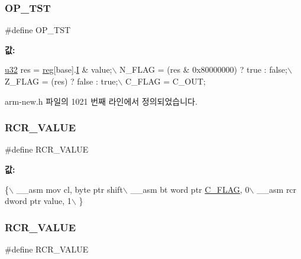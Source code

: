 \subsubsection{\texorpdfstring{O\+P\+\_\+\+T\+ST}{OP\_TST}\hspace{0.1cm}{\footnotesize\ttfamily [2/2]}}
{\footnotesize\ttfamily \#define O\+P\+\_\+\+T\+ST}

{\bfseries 값\+:}
\begin{DoxyCode}
\mbox{\hyperlink{_system_8h_a10e94b422ef0c20dcdec20d31a1f5049}{u32}} res = \mbox{\hyperlink{_g_b_a_8h_ae29faba89509024ffd1a292badcedf2d}{reg}}[base].\mbox{\hyperlink{unionreg__pair_a9f6a42d56c07829d7013571eda998252}{I}} & value;\(\backslash\)
      N\_FLAG = (res & 0x80000000) ? \textcolor{keyword}{true} : \textcolor{keyword}{false};\(\backslash\)
      Z\_FLAG = (res) ? \textcolor{keyword}{false} : \textcolor{keyword}{true};\(\backslash\)
      C\_FLAG = C\_OUT;
\end{DoxyCode}


arm-\/new.\+h 파일의 1021 번째 라인에서 정의되었습니다.

\mbox{\label{_g_b_a_8cpp_a3e5cbbfc0d14d2647260250013c74d8a}} 
\subsubsection{\texorpdfstring{R\+C\+R\+\_\+\+V\+A\+L\+UE}{RCR\_VALUE}\hspace{0.1cm}{\footnotesize\ttfamily [1/2]}}
{\footnotesize\ttfamily \#define R\+C\+R\+\_\+\+V\+A\+L\+UE}

{\bfseries 값\+:}
\begin{DoxyCode}
\{\(\backslash\)
        \_\_asm mov cl, byte ptr shift\(\backslash\)
        \_\_asm bt word ptr \mbox{\hyperlink{_g_b_8h_aa29c80f7f7f901ec7a2c57887f56585d}{C\_FLAG}}, 0\(\backslash\)
        \_\_asm rcr dword ptr value, 1\(\backslash\)
      \}
\end{DoxyCode}
\mbox{\label{arm-new_8h_a3e5cbbfc0d14d2647260250013c74d8a}} 
\subsubsection{\texorpdfstring{R\+C\+R\+\_\+\+V\+A\+L\+UE}{RCR\_VALUE}\hspace{0.1cm}{\footnotesize\ttfamily [2/2]}}
{\footnotesize\ttfamily \#define R\+C\+R\+\_\+\+V\+A\+L\+UE}

